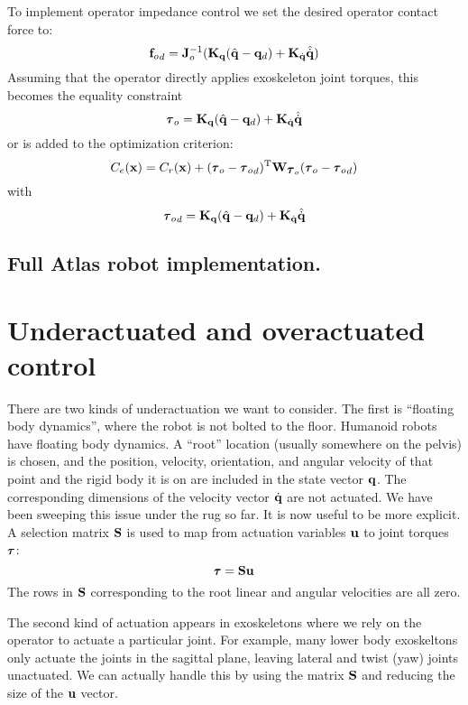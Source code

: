 \documentclass[letterpaper,12pt,fullpage]{article}
\begin{document}
To implement operator impedance control we set the desired operator contact force to:
\begin{equation}
{{\bf f}_o}_d = {\bf J}_o^{-1} ( {\bf K}_{{\bf q}}( \hat{{\bf q}} - {\bf q}_d ) + {\bf K}_{\dot{{\bf q}}} \hat{\dot{{\bf q}}} )
\end{equation}
Assuming that the operator directly applies exoskeleton joint torques, this becomes
the equality constraint
\begin{equation}
\vtau_o = \mK_{\vq}( \hat{\vq} - \vq_d ) + \mK_{\dot{\vq}} \hat{\dot{\vq}}
\end{equation}
or is added to the optimization criterion:
\begin{equation}
C_e(\vx) = C_r(\vx) 
+ (\vtau_o - {\vtau_o}_d)^{\tr} \mW_{\vtau_o} (\vtau_o - {\vtau_o}_d)
\end{equation}
with
\begin{equation}
{\vtau_o}_d = \mK_{\vq}( \hat{\vq} - \vq_d ) + \mK_{\dot{\vq}} \hat{\dot{\vq}}
\end{equation}

\subsection{Full Atlas robot implementation.}

\section{Underactuated and overactuated control}

There are two kinds of underactuation we want to consider. The first
is ``floating body dynamics'', where the robot is not bolted to the floor.
Humanoid robots have floating body dynamics. A ``root'' location (usually somewhere
on the pelvis) is chosen, and the position, velocity, orientation, and angular
velocity of that point and the rigid body it is on
are included in the state vector ${\bf q}$. The corresponding dimensions of the
velocity vector $\dot{{\bf q}}$ are not actuated. We have been sweeping this
issue under the rug so far. It is now useful to be more explicit. A selection matrix
${\bf S}$ is used to map from actuation variables ${\bf u}$ to joint torques $\vtau$:
\begin{equation}
\vtau = \mS \vu
\end{equation}
The rows in ${\bf S}$ corresponding to the root linear and angular velocities
are all zero.

The second kind of actuation appears in exoskeletons where we rely on the
operator to actuate a particular joint. For example, many lower body
exoskeltons only actuate the joints in the sagittal plane, leaving lateral
and twist (yaw) joints unactuated. We can actually handle this by using
the matrix ${\bf S}$ and reducing the size of the ${\bf u}$ vector.
\end{document}
